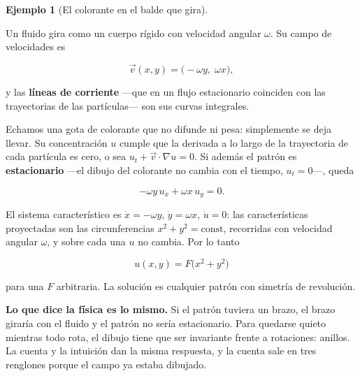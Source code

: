 \documentclass[
  spanish,
  a4paper,
]{scrbook}
\theoremstyle{definition}
\theoremstyle{plain}
\theoremstyle{definition}
\newtheorem{example}{Ejemplo}[chapter]
\theoremstyle{plain}
\theoremstyle{definition}
\theoremstyle{remark}
\begin{document}
\begin{example}[El colorante en el balde que
gira]\protect\hypertarget{exm-corriente}{}\label{exm-corriente}

Un fluido gira como un cuerpo rígido con velocidad angular \(\omega\).
Su campo de velocidades es

\[
\vec v(x,y) = \big(-\omega y,\; \omega x\big) ,
\]

y las \textbf{líneas de corriente} ---que en un flujo estacionario
coinciden con las trayectorias de las partículas--- son sus curvas
integrales.

Echamos una gota de colorante que no difunde ni pesa: simplemente se
deja llevar. Su concentración \(u\) cumple que la derivada a lo largo de
la trayectoria de cada partícula es cero, o sea
\(u_t + \vec v \cdot \nabla u = 0\). Si además el patrón es
\textbf{estacionario} ---el dibujo del colorante no cambia con el
tiempo, \(u_t = 0\)---, queda

\[
-\omega y\,u_x + \omega x\,u_y = 0 .
\]

El sistema característico es \(\dot x = -\omega y\),
\(\dot y = \omega x\), \(\dot u = 0\): las características proyectadas
son las circunferencias \(x^2 + y^2 = \text{const}\), recorridas con
velocidad angular \(\omega\), y sobre cada una \(u\) no cambia. Por lo
tanto

\[
u(x,y) = F\big(x^2 + y^2\big)
\]

para una \(F\) arbitraria. La solución es cualquier patrón con simetría
de revolución.

\textbf{Lo que dice la física es lo mismo.} Si el patrón tuviera un
brazo, el brazo giraría con el fluido y el patrón no sería estacionario.
Para quedarse quieto mientras todo rota, el dibujo tiene que ser
invariante frente a rotaciones: anillos. La cuenta y la intuición dan la
misma respuesta, y la cuenta sale en tres renglones porque el campo ya
estaba dibujado.

\end{example}
\end{document}
